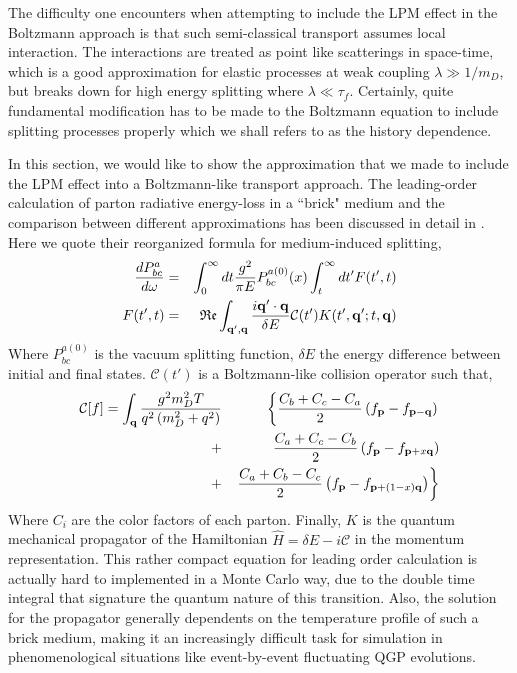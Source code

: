 \documentclass[aps, prc, reprint, amsmath, groupedaddress, nofootinbib]{revtex4-1}
\begin{document}
The difficulty one encounters when attempting to include the LPM effect in the Boltzmann approach is that such semi-classical transport assumes local interaction.
The interactions are treated as point like scatterings in space-time, which is a good approximation for elastic processes at weak coupling $\lambda \gg 1/m_D$, but breaks down for high energy splitting where $\lambda \ll \tau_f$.
Certainly, quite fundamental modification has to be made to the Boltzmann equation to include splitting processes properly which we shall refers to as the history dependence.

In this section, we would like to show the approximation that we made to include the LPM effect into a Boltzmann-like transport approach.
The leading-order calculation of parton radiative energy-loss in a ``brick" medium and the comparison between different approximations has been discussed in detail in \cite{CaronHuot:2010bp}.
Here we quote their reorganized formula for medium-induced splitting,
\begin{eqnarray}
\frac{dP^{a}_{bc}}{d\omega} &=& \int_0^\infty dt \frac{g^2}{\pi E} P_{bc}^{a(0)}(x) \int_t^\infty dt'  F(t', t)\label{eq:LO-eq}\\
F(t', t) &=& \mathfrak{Re} \int_{{\bf q}', {\bf q}} \frac{i {\bf q}'\cdot {\bf q}}{\delta E} \mathcal{C}(t') K(t', {\bf q}'; t, {\bf q})
\end{eqnarray}
Where $P_{bc}^{a(0)}$ is the vacuum splitting function, $\delta E$ the energy difference between initial and final states. $\mathcal{C}(t')$ is a Boltzmann-like collision operator such that,
\begin{eqnarray}
\mathcal{C}[f] = \int_{\bf q} \frac{g^2 m_D^2 T}{q^2\left(m_D^2+q^2\right)}
&&\left\{  \frac{C_b+C_c-C_a}{2}\left(f_{\bf p}-f_{{\bf p}-{\bf q}}\right) \right.\\\nonumber
 +&&    \frac{C_a+C_c-C_b}{2}\left(f_{\bf p}-f_{{\bf p}+x{\bf q}}\right) \\\nonumber
+&&  \left. \frac{C_a+C_b-C_c}{2}\left(f_{\bf p}-f_{{\bf p}+(1-x){\bf q}}\right)\right\}
\end{eqnarray}
Where $C_i$ are the color factors of each parton.
Finally, $K$ is the quantum mechanical propagator of the Hamiltonian $\hat{H} = \delta E - i\mathcal{C}$ in the momentum representation.
This rather compact equation for leading order calculation is actually hard to implemented in a Monte Carlo way, due to the double time integral that signature the quantum nature of this transition.
Also, the solution for the propagator generally dependents on the temperature profile of such a brick medium, making it an increasingly difficult task for simulation in phenomenological situations like event-by-event fluctuating QGP evolutions.
\end{document}
